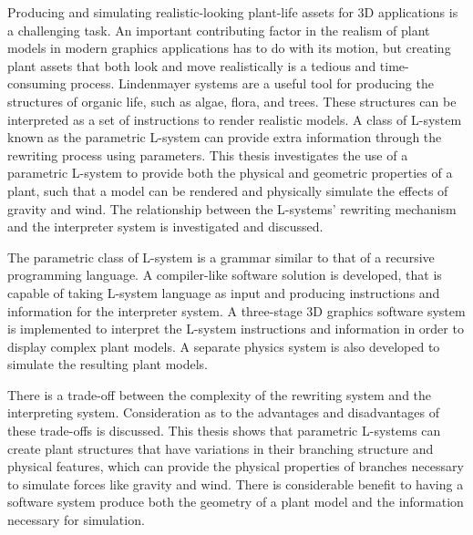Producing and simulating realistic-looking plant-life assets for 3D applications is a challenging task. An important contributing factor in the realism of plant models in modern graphics applications has to do with its motion, but creating plant assets that both look and move realistically is a tedious and time-consuming process. Lindenmayer systems are a useful tool for producing the structures of organic life, such as algae, flora, and trees. These structures can be interpreted as a set of instructions to render realistic models. A class of L-system known as the parametric L-system can provide extra information through the rewriting process using parameters. This thesis investigates the use of a parametric L-system to provide both the physical and geometric properties of a plant, such that a model can be rendered and physically simulate the effects of gravity and wind. The relationship between the  L-systems' rewriting mechanism and the interpreter system is investigated and discussed. 

The parametric class of L-system is a grammar similar to that of a recursive programming language. A compiler-like software solution is developed, that is capable of taking L-system language as input and producing instructions and information for the interpreter system. A three-stage 3D graphics software system is implemented to interpret the L-system instructions and information in order to display complex plant models. A separate physics system is also developed to simulate the resulting plant models.

There is a trade-off between the complexity of the rewriting system and the interpreting system. Consideration as to the advantages and disadvantages of these trade-offs is discussed. This thesis shows that parametric L-systems can create plant structures that have variations in their branching structure and physical features, which can provide the physical properties of branches necessary to simulate forces like gravity and wind.  There is considerable benefit to having a software system produce both the geometry of a plant model and the information necessary for simulation. 
